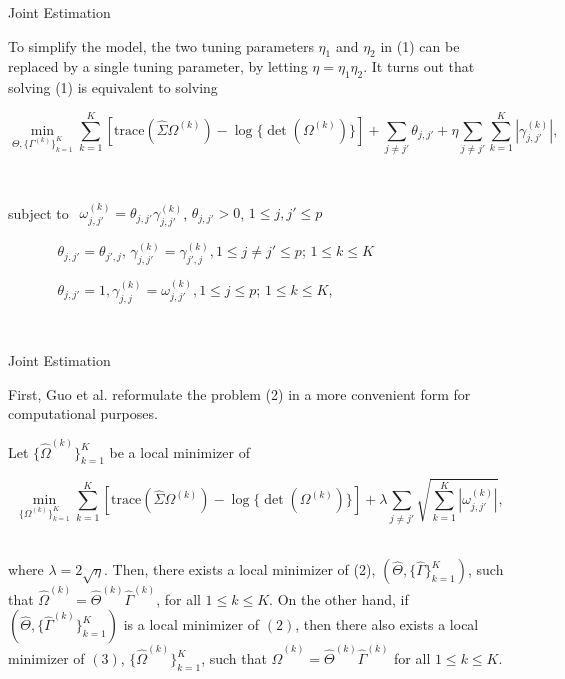 \documentclass[t]{beamer}
\begin{document}
    \begin{frame}{Joint Estimation}
    
    To simplify the model, the two tuning parameters $\eta_1$ and $\eta_2$ in (1) can be replaced by a
      single tuning parameter, by letting $\eta = \eta_1 \eta_2$. It turns out that solving (1) is equivalent to
      solving
      
      \begin{equation}  
      \underset{\Theta,\{ \Gamma^{(k)}\}_{k=1}^{K}}{\min}   \sum_{k=1}^{K} [\mbox{trace}(\hat{\Sigma} \Omega^{(k)}) - \log\{ \det(\Omega^{(k)})\}] +  \underset{j \neq j'}{\sum} \theta_{j,j'} + \eta \underset{j \neq j'}{\sum} \sum_{k=1}^K |\gamma_{j,j'}^{(k)}|,   
       \end{equation}
       
        \
        
        subject to    $\ \ \omega_{j,j'}^{(k)}=\theta_{j,j'} \gamma_{j,j'}^{(k)}$, $\theta_{j,j'} > 0$, $1 \leq j,j' \leq p$
        
        $\ \ \ \ \ \ \ \ \ \ \ \ \ \ \ \ \theta_{j,j'} = \theta_{j',j}$, $\gamma_{j,j'}^{(k)} = \gamma_{j',j}^{(k)}, 1 \leq j \neq j' \leq p$; $1 \leq k \leq K$
        
        $\ \ \ \ \ \ \ \ \ \ \ \ \ \  \ \ \theta_{j,j'}=1,\gamma_{j,j}^{(k)}=\omega_{j,j'}^{(k)} , 1 \leq j \leq p$; $1 \leq k \leq K$,
        
        \
        \end{frame}
        
 
           \begin{frame}{Joint Estimation}
            
            
             First, Guo et al. reformulate the problem (2) in a more convenient form for computational purposes. 

\bigskip
\pause
 Let $\{ \hat{\Omega}^{(k)}\}_{k=1}^K$ be a local minimizer of
              
              
             \begin{equation}
              \underset{ \{ \Omega^{(k)}\}_{k=1}^{K}}{\min}   \sum_{k=1}^{K} [\mbox{trace}(\hat{\Sigma} \Omega^{(k)}) - \log\{ \det(\Omega^{(k)})\}] + \lambda \underset{j \neq j'}{\sum} \sqrt{\sum_{k=1}^K |\omega_{j,j'}^{(k)}|},
              \end{equation}
              \
              
              where $\lambda = 2 \sqrt{\eta}$. Then, there exists a local minimizer of (2), $(\hat{\Theta}, \{ \hat{\Gamma}\}_{k=1}^K) $, such that $\hat{\Omega}^{(k)} = \hat{\Theta}^{(k)} \hat{\Gamma}^{(k)}$, for all $1 \leq k \leq K$. On the other hand, if $(\hat{\Theta},\{ \hat{\Gamma}^{(k)}\}_{k=1}^K)$ is a local minimizer of $(2)$, then there also exists a local minimizer of $(3)$, $\{ \hat{\Omega}^{(k)}\}_{k=1}^K$, such that $\hat{\Omega}^{(k)} = \hat{\Theta}^{(k)} \hat{\Gamma}^{(k)}$ for all $1 \leq k \leq K$.
              
             \end{frame}
\end{document}
